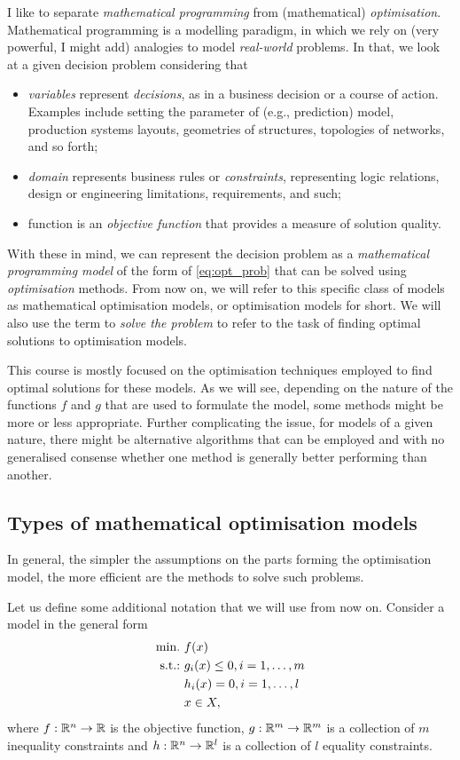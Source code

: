I like to separate \emph{mathematical programming} from (mathematical) \emph{optimisation}. Mathematical programming is a modelling paradigm, in which we rely on (very powerful, I might add) analogies to model \emph{real-world} problems. In that, we look at a given decision problem considering that
%
\begin{itemize}
    \item \emph{variables} represent \emph{decisions}, as in a business decision or a course of action. Examples include setting the parameter of (e.g., prediction) model, production systems layouts, geometries of structures, topologies of networks, and so forth; 
    \item \emph{domain} represents business rules or \emph{constraints}, representing logic relations, design or engineering limitations, requirements, and such; 
    \item function is an \emph{objective function} that provides a measure of solution quality.  
\end{itemize}
%    
With these in mind, we can represent the decision problem as a \emph{mathematical programming model} of the form of \eqref{eq:opt_prob} that can be solved using \emph{optimisation} methods. From now on, we will refer to this specific class of models as mathematical optimisation models, or optimisation models for short. We will also use the term to \emph{solve the problem} to refer to the task of finding optimal solutions to optimisation models.

This course is mostly focused on the optimisation techniques employed to find optimal solutions for these models. As we will see, depending on the nature of the functions $f$ and $g$ that are used to formulate the model, some methods might be more or less appropriate. Further complicating the issue, for models of a given nature, there might be alternative algorithms that can be employed and with no generalised consense whether one method is generally better performing than another.

\subsection{Types of mathematical optimisation models}

In general, the simpler the assumptions on the parts forming the optimisation model, the more efficient are the methods to solve such problems. 

Let us define some additional notation that we will use from now on. Consider a model in the general form
%
\begin{align*}
	\mathop{\text{min.~}} & f(x) \\
	\mathop{\text{s.t.:~}}   & g_i(x) \leq 0, i = 1, \dots, m \\
	      & h_i(x) = 0, i = 1, \dots, l \\
	      & x \in X,  
\end{align*}
%
where $f: \mathbb{R}^n \to \mathbb{R}$ is the objective function, $g:\mathbb{R}^m \to \mathbb{R}^m$ is a collection of $m$ inequality constraints and $h: \mathbb{R}^n \to \mathbb{R}^l$ is a collection of $l$ equality constraints.

